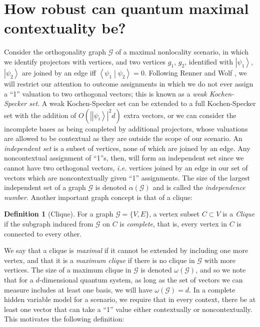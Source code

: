 \documentclass{amsart}
\theoremstyle{definition}
\newtheorem{defn}{Definition}
\newcommand{\ket}[1]{{\left\vert{#1}\right\rangle}}
\newcommand{\braket}[2]{{\left< {#1} \middle\vert {#2}\right>}}
\begin{document}
\section{How robust can quantum maximal contextuality be?}

Consider the orthogonality graph $\mathcal{G}$ of a maximal nonlocality scenario, in which we identify projectors with vertices, and two vertices $g_1$, $g_2$, identified with $\ket{\psi_1}$, $\ket{\psi_2}$ are joined by an edge iff $\braket{\psi_1}{\psi_2}=0$. Following Renner and Wolf \cite{Renn2004}, we will restrict our attention to outcome assignments in which we do not ever assign a ``1'' valuation to two orthogonal vectors; this is known as a \emph{weak Kochen-Specker set}. A weak Kochen-Specker set can be extended to a full Kochen-Specker set with the addition of $O(|\ket{\psi_i}|^2d)$ extra vectors, or we can consider the incomplete bases as being completed by additional projectors, whose valuations are allowed to be contextual as they are outside the scope of our scenario. An \emph{independent set} is a subset of vertices, none of which are joined by an edge. Any noncontextual assignment of ``1''s, then, will form an independent set since we cannot have two orthogonal vectors, \emph{i.e.} vertices joined by an edge in our set of vectors which are noncontextually given ``1'' assignments. The size of the largest independent set of a graph $\mathcal{G}$ is denoted $\alpha(\mathcal{G})$ and is called the \emph{independence number}. Another important graph concept is that of a clique:%

\begin{defn}[Clique]
For a graph $\mathcal{G}=\{V,E\}$, a vertex subset $C\subset V$ is a \emph{Clique} if the subgraph induced from $\mathcal{G}$ on $C$ is \emph{complete}, that is,  every vertex in $C$ is connected to every other.
\end{defn}

We say that a clique is \emph{maximal} if it cannot be extended by including one more vertex, and that it is a \emph{maximum clique} if there is no clique in $\mathcal{G}$ with more vertices. The size of a maximum clique in $\mathcal{G}$ is denoted $\omega(\mathcal{G})$, and so we note that for a $d$-dimensional quantum system, as long as the set of vectors we can measure includes at least one basis, we will have $\omega(\mathcal{G})=d$. In a complete hidden variable model for a scenario, we require that in every context, there be at least one vector that can take a ``1'' value either contextually or noncontextually. This motivates the following definition:
\end{document}
